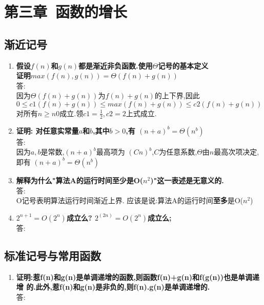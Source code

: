 \newpage
\section{\LARGE 第三章\ 函数的增长}

\subsection{渐近记号}
\begin{enumerate} %
\item
\textbf{假设$f(n)$和$g(n)$都是渐近非负函数.使用$\Theta$记号的基本定义\\
        证明$max(f(n),g(n))=\Theta(f(n)+g(n))$}\\
答:\\
因为$\Theta(f(n)+g(n))$为$f(n)+g(n)$的上下界,因此\\
$0 \leq c1(f(n) + g(n)) \leq max(f(n) + g(n)) \leq c2 (f(n) + g(n))$\\
对所有$n\geq n0$成立.领$c1=\frac{1}{2}, c2=2$上式成立.

\item
\textbf{证明: 对任意实常量$a$和$b$,其中$b>0$,有 $(n+a)^b = \Theta(n^b)$} \\ 
答:\\
 因为$a,b$是常数,$(n+a)^b$最高项为 $(Cn)^b$,$C$为任意系数,$\Theta$由$n$最高次项决定,
 即有 $(n+a)^b = \Theta(n^b)$
 
\item
\textbf{解释为什么"算法A的运行时间至少是O($n^2$)"这一表述是无意义的.}\\
答:\\
O记号表明算法运行时间渐近上界. 应该是说:算法A的运行时间\textbf{至多}是O($n^2$)

\item
\textbf{$2^{n+1}=O(2^n)$成立么? $2^(2n)=O(2^n)$成立么;}\\
答:\\


\end{enumerate}

\subsection{标准记号与常用函数}
\begin{enumerate} %
\item
\textbf{证明:惹f(n)和g(n)是单调递增的函数,则函数f(n)+g(n)和f(g(n))也是单调递增
        的.此外,惹f(n)和g(n)是非负的,则f(n).g(n)是单调递增的.}\\
答:\\

\end{enumerate}

